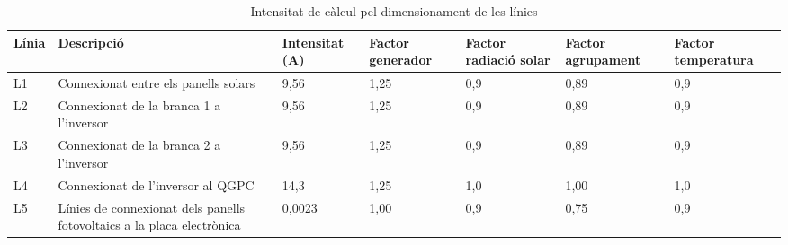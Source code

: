 \begin{table}[H]
\scriptsize
  \centering
    \begin{tabu} to \textwidth  {|X[0.3, l]|X[2, l]|X[0.5, r]|X[0.6, r]|X[0.5, r]|X[0.5, r]|X[0.5, r]|} \hline
Línia &  Descripció & Intensitat (A) & Factor generador & Factor radiació solar & Factor agrupament  & Factor temperatura\\ \hline \hline
L1 & Connexionat entre els panells solars & 9,56 & 1,25 & 0,9 & 0,89 & 0,9 \\ \hline
L2 & Connexionat de la branca 1 a l'inversor & 9,56 & 1,25 & 0,9 & 0,89 & 0,9\\ \hline
L3 & Connexionat de la branca 2 a l'inversor & 9,56 & 1,25 & 0,9 & 0,89 & 0,9\\ \hline
L4 & Connexionat de l'inversor al QGPC & 14,3 & 1,25 & 1,0 & 1,00 & 1,0 \\ \hline \hline
L5 & Línies de connexionat dels panells fotovoltaics a la placa electrònica & 0,0023 & 1,00 & 0,9 & 0,75 & 0,9 \\ \hline
	
    \end{tabu}%
  \caption{Intensitat de càlcul pel dimensionament de les línies}
    \label{tab:taulax}%
 \end{table}%

